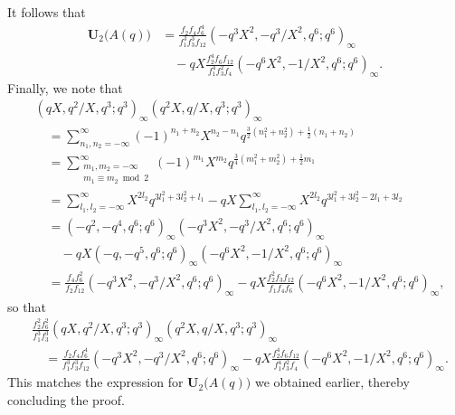 \documentclass[12pt,reqno]{amsart}
\numberwithin{equation}{section}
\theoremstyle{plain}
\theoremstyle{definition}
\theoremstyle{named}
\newcommand{\UU}{\mathbf{U}}
\begin{document}
It follows that
\begin{align*}
	\UU_2\big(A(q)\big) &= \frac{f_2 f_4 f_6^4}{f_1^3 f_3^3 f_{12}}(-q^3X^2,-q^3/X^2,q^{6};q^{6})_\infty\\
	&\quad - qX \frac{f_2^4 f_6 f_{12}}{f_1^4 f_3^2 f_4}(-q^{6}X^2,-1/X^2,q^{6};q^{6})_\infty.
\end{align*}
Finally, we note that
\begin{align*}
	&(qX,q^2/X,q^3;q^3)_\infty (q^2X,q/X,q^3;q^3)_\infty\\
	&\quad = \sum_{n_1,n_2=-\infty}^\infty (-1)^{n_1+n_2} X^{n_2-n_1} q^{\frac{3}{2}(n_1^2+n_2^2)+\frac{1}{2}(n_1+n_2)}\\
	&\quad = \sum_{\substack{m_1,m_2=-\infty\\m_1\equiv m_2 \bmod{2}}}^\infty (-1)^{m_1} X^{m_2} q^{\frac{3}{4}(m_1^2+m_2^2)+\frac{1}{2}m_1}\\
	&\quad = \sum_{l_1,l_2=-\infty}^\infty X^{2l_2} q^{3l_1^2+3l_2^2+l_1} - qX \sum_{l_1,l_2=-\infty}^\infty X^{2l_2} q^{3l_1^2+3l_2^2-2l_1+3l_2}\\
	&\quad = (-q^2,-q^4,q^6;q^6)_\infty (-q^3X^2,-q^3/X^2,q^6;q^6)_\infty\\
	&\quad\quad - qX (-q,-q^5,q^6;q^6)_\infty (-q^6X^2,-1/X^2,q^6;q^6)_\infty\\
	&\quad = \frac{f_4 f_6^2}{f_2 f_{12}}(-q^3X^2,-q^3/X^2,q^6;q^6)_\infty - qX \frac{f_2^2 f_3 f_{12}}{f_1 f_4 f_6} (-q^6X^2,-1/X^2,q^6;q^6)_\infty,
\end{align*}
so that
\begin{align*}
	&\frac{f_2^2 f_6^2}{f_1^3 f_3^3}(qX,q^2/X,q^3;q^3)_\infty (q^2X,q/X,q^3;q^3)_\infty\\
	&\quad = \frac{f_2 f_4 f_6^4}{f_1^3 f_3^3 f_{12}}(-q^3X^2,-q^3/X^2,q^{6};q^{6})_\infty - qX \frac{f_2^4 f_6 f_{12}}{f_1^4 f_3^2 f_4}(-q^{6}X^2,-1/X^2,q^{6};q^{6})_\infty.
\end{align*}
This matches the expression for $\UU_2\big(A(q)\big)$ we obtained earlier, thereby concluding the proof.
\end{document}

